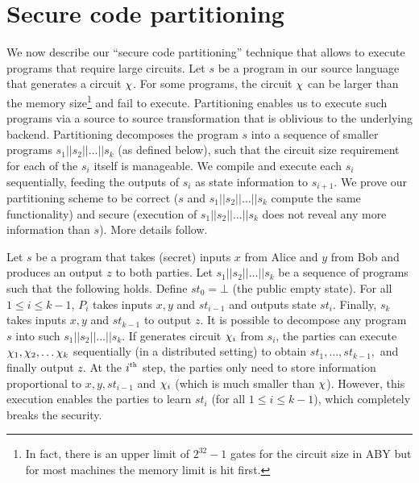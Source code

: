 \section{Secure code partitioning}
\label{sec:pipe}

\newcommand{\prog}{s}
\newcommand{\seq}{||}
\newcommand{\state}{st}

We  now describe our ``secure code partitioning'' technique that
allows \tool to execute programs that require large circuits.
Let $\prog$ be a program in our source language that
generates a circuit $\chi$. For some programs, the circuit $\chi$
can be larger than
the memory size\footnote{In fact, there is
  an upper limit of $2^{32}-1$ gates for the circuit size in ABY but
  for most machines the memory limit is hit first.} and fail to
execute. Partitioning enables us to 
execute such programs via a source to source transformation that is
oblivious to the underlying \mpc backend. Partitioning decomposes the
program $\prog$ into a sequence of smaller \tool programs
$\prog_1\seq\prog_2\seq\dots\seq\prog_k$ (as defined below), such
that the circuit size
requirement for each of the $\prog_i$ itself is manageable. We compile
and execute each $\prog_i$ sequentially, feeding the outputs of
$\prog_i$ as state
information to $\prog_{i+1}$. We prove our partitioning scheme to be
correct ($\prog$ and $\prog_1\seq\prog_2\seq\dots\seq\prog_k$ compute
the same functionality) and secure (execution of
$\prog_1\seq\prog_2\seq\dots\seq\prog_k$ does
not reveal any more information than $s$). More details follow.

Let $\prog$ be a program that takes (secret) inputs $x$ from Alice and
$y$ from Bob and produces an output $z$ to both parties. Let
$\prog_1\seq\prog_2\seq\dots\seq\prog_k$ be a sequence of programs
such that the following holds. Define $\state_0 = \bot$ (the public empty
state). For all
$1\leq i\leq k-1$, $P_i$ takes inputs $x, y$ and $\state_{i-1}$ and
outputs state $\state_i$. Finally, $\prog_k$ takes inputs $x, y$ and
$\state_{k-1}$ to  output $z$. It is
possible to decompose any program $\prog$  into such
$\prog_1\seq\prog_2\seq\dots\seq\prog_k$. If \tool generates circuit
$\chi_i$ from
$\prog_i$, the parties can execute
$\chi_1, \chi_2, \dots \chi_k$
sequentially (in a distributed setting)  to obtain
$\state_1,\dots,\state_{k-1},$ and finally output $z$. At the
$i^{\textrm{\tiny{th}}}$ step, the parties only need to store
information proportional to $x,y,\state_{i-1}$ and $\chi_i$ (which is
much smaller than $\chi$). However, this execution enables the
parties to learn $\state_i$ (for all $1\leq i\leq k-1$), which
completely breaks the security.

